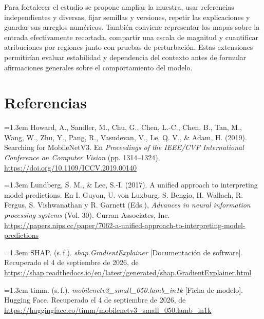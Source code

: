 \documentclass[10pt,a4paper,twocolumn]{article}
\newcommand{\aparef}[1]{\par\noindent\hangindent=1.3em\hangafter=1 #1\par\medskip}
\begin{document}
Para fortalecer el estudio se propone ampliar la muestra, usar referencias independientes y diversas, fijar semillas y versiones, repetir las explicaciones y guardar sus arreglos numéricos. También conviene representar los mapas sobre la entrada efectivamente recortada, compartir una escala de magnitud y cuantificar atribuciones por regiones junto con pruebas de perturbación. Estas extensiones permitirían evaluar estabilidad y dependencia del contexto antes de formular afirmaciones generales sobre el comportamiento del modelo.

\section*{Referencias}
\begingroup
\small
\raggedright
\aparef{Howard, A., Sandler, M., Chu, G., Chen, L.-C., Chen, B., Tan, M., Wang, W., Zhu, Y., Pang, R., Vasudevan, V., Le, Q. V., \& Adam, H. (2019). Searching for MobileNetV3. En \textit{Proceedings of the IEEE/CVF International Conference on Computer Vision} (pp. 1314--1324). \url{https://doi.org/10.1109/ICCV.2019.00140}}
\aparef{Lundberg, S. M., \& Lee, S.-I. (2017). A unified approach to interpreting model predictions. En I. Guyon, U. von Luxburg, S. Bengio, H. Wallach, R. Fergus, S. Vishwanathan y R. Garnett (Eds.), \textit{Advances in neural information processing systems} (Vol. 30). Curran Associates, Inc. \url{https://papers.nips.cc/paper/7062-a-unified-approach-to-interpreting-model-predictions}}
\aparef{SHAP. (s.\,f.). \textit{shap.GradientExplainer} [Documentación de software]. Recuperado el 4 de septiembre de 2026, de \url{https://shap.readthedocs.io/en/latest/generated/shap.GradientExplainer.html}}
\aparef{timm. (s.\,f.). \textit{mobilenetv3\_small\_050.lamb\_in1k} [Ficha de modelo]. Hugging Face. Recuperado el 4 de septiembre de 2026, de \url{https://huggingface.co/timm/mobilenetv3_small_050.lamb_in1k}}
\endgroup
\end{document}
